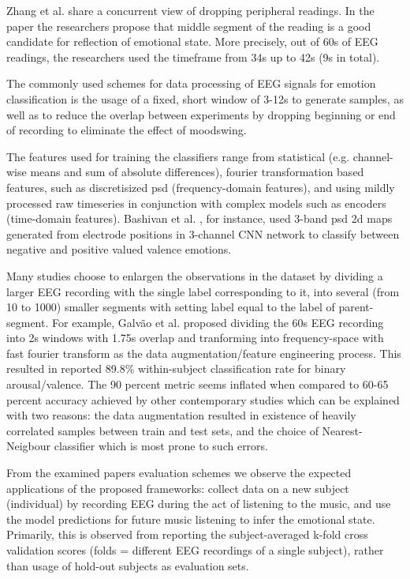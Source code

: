 \documentclass[14pt]{extreport}
\begin{document}
Zhang et al. share a concurrent view of dropping peripheral readings. In the paper \cite{zhang} the researchers propose that middle segment of the reading is a good candidate for reflection of emotional state. More precisely, out of 60s of EEG readings, the researchers used the timeframe from 34s up to 42s (9s in total). 

The commonly used schemes for data processing of EEG signals for emotion classification is the usage of a fixed, short window of 3-12s to generate samples, as well as to reduce the overlap between experiments by dropping beginning or end of recording to eliminate the effect of moodswing.

The features used for training the classifiers range from statistical (e.g. channel-wise means and sum of absolute differences), fourier transformation based features, such as discretisized \acrfull{psd} (frequency-domain features), and using mildly processed raw timeseries in conjunction with complex models such as encoders (time-domain features). Bashivan et al. \cite{bashivan}, for instance, used 3-band \acrlong{psd} 2d maps generated from electrode positions in 3-channel CNN network to classify between negative and positive valued valence emotions. 

Many studies choose to enlargen the observations in the dataset by dividing a larger EEG recording with the single label corresponding to it, into several (from 10 to 1000) smaller segments with setting label equal to the label of parent-segment. For example, Galvão et al. \cite{galvao} proposed dividing the 60s EEG recording into 2s windows with 1.75s overlap and tranforming into frequency-space with fast fourier transform as the data augmentation/feature engineering process. This resulted in reported 89.8\% within-subject classification rate for binary arousal/valence. The 90 percent metric seems inflated when compared to 60-65 percent accuracy achieved by other contemporary studies which can be explained with two reasons: the data augmentation resulted in existence of heavily correlated samples between train and test sets, and the choice of Nearest-Neigbour classifier which is most prone to such errors. 

From the examined papers evaluation schemes we observe the expected applications of the proposed frameworks: collect data on a new subject (individual) by recording EEG during the act of listening to the music, and use the model predictions for future music listening to infer the emotional state. Primarily, this is observed from reporting the subject-averaged k-fold cross validation scores (folds = different EEG recordings of a single subject), rather than usage of hold-out subjects as evaluation sets.
\end{document}
